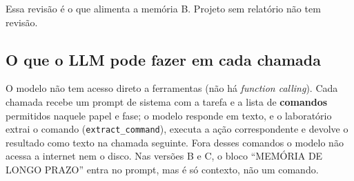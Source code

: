 \documentclass[11pt,a4paper]{article}
\begin{document}
Essa revisão é o que alimenta a memória B. Projeto sem relatório não tem revisão.

\subsection{O que o LLM pode fazer em cada chamada}
\label{sec:ferramentas}

O modelo não tem acesso direto a ferramentas (não há \emph{function calling}). Cada chamada
recebe um prompt de sistema com a tarefa e a lista de \textbf{comandos} permitidos naquele
papel e fase; o modelo responde em texto, e o laboratório extrai o comando
(\texttt{extract\_command}), executa a ação correspondente e devolve o resultado como texto na
chamada seguinte. Fora desses comandos o modelo não acessa a internet nem o disco. Nas versões
B e C, o bloco ``MEMÓRIA DE LONGO PRAZO'' entra no prompt, mas é só contexto, não um comando.
\end{document}
